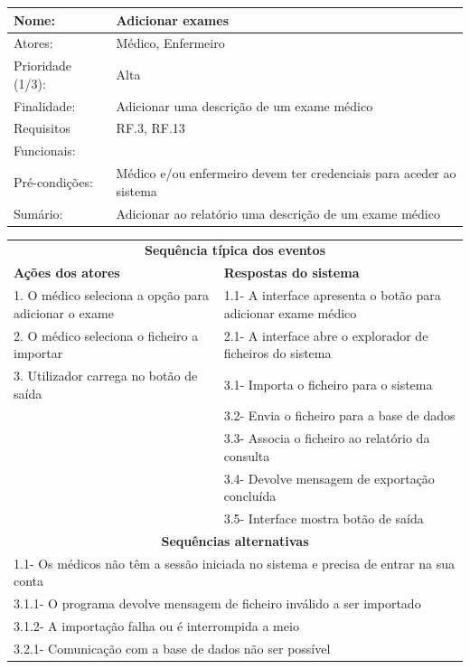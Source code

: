 \documentclass[11pt,a4paper,twoside]{report}
\begin{document}
\begin{center}
	\begin{tabularx}{\textwidth}{|lX|}
		\hline
		\textbf{Nome}: & \textbf{Adicionar exames} \\ \hline
		Atores: & Médico, Enfermeiro    \\ \hline
		Prioridade (1/3): & Alta  \\ \hline
		Finalidade: & Adicionar uma descrição de um exame médico      \\ \hline
		Requisitos & RF.3, RF.13    \\
		Funcionais: & \\
		Pré-condições: & Médico e/ou enfermeiro devem ter credenciais para aceder ao sistema \\
		Sumário: & Adicionar ao relatório uma descrição de um exame médico  \\
		\hline
	\end{tabularx}
	
	\begin{tabularx}{\textwidth}{|XX|}
		\hline
		\multicolumn{2}{|c|}{\textbf{Sequência típica dos eventos} }\\
		\textbf{Ações dos atores}  & \textbf{Respostas do sistema} \\
		1.      O médico seleciona a opção para adicionar o exame    &   1.1- A interface apresenta o botão para adicionar exame médico   \\
		2.       O médico seleciona o ficheiro a importar     & 2.1-     A interface abre o explorador de ficheiros do sistema   \\
		3.      Utilizador carrega no botão de saída     & 3.1-     Importa o ficheiro para o sistema   \\
		& 3.2-     Envia o ficheiro para a base de dados \\
		&  3.3-   Associa o ficheiro ao relatório da consulta \\
		& 3.4-    Devolve mensagem de exportação concluída \\
		& 3.5-     Interface mostra botão de saída \\
		\hline
		\multicolumn{2}{|c|}{\textbf{Sequências alternativas } }\\
		\hline
		\multicolumn{2}{|l|}{ 1.1- Os médicos não têm a sessão iniciada no sistema e precisa de entrar na sua conta  }\\
		\multicolumn{2}{|l|}{ 3.1.1- O programa devolve mensagem de ficheiro inválido a ser importado  }\\
		\multicolumn{2}{|l|}{ 3.1.2- A importação falha ou é interrompida a meio }\\
		\multicolumn{2}{|l|}{3.2.1- Comunicação com a base de dados não ser possível  }\\
		\hline
	\end{tabularx}
	
\end{center}
\end{document}
